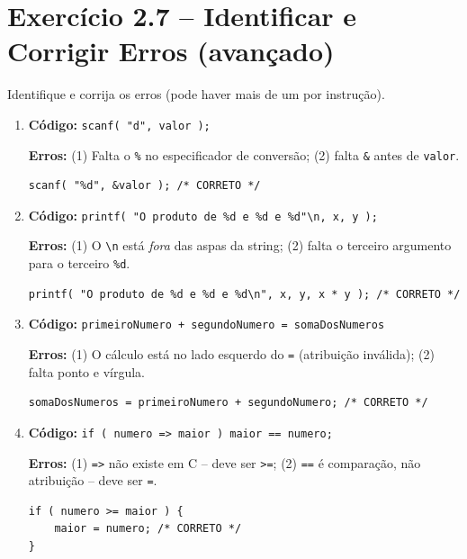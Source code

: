 \documentclass[12pt,a4paper]{article}
\begin{document}
\section{Exercício 2.7 -- Identificar e Corrigir Erros (avançado)}

\begin{enunciadoBox}[Enunciado 2.7]
Identifique e corrija os erros (pode haver mais de um por instrução).
\end{enunciadoBox}

\begin{respostabox}
\begin{enumerate}[label=\textbf{\alph*)}]

\item \textbf{Código:} \texttt{scanf( "d", valor );}

\textbf{Erros:} (1) Falta o \texttt{\%} no especificador de conversão; (2) falta \texttt{\&} antes de \texttt{valor}.
\begin{lstlisting}
scanf( "%d", &valor ); /* CORRETO */
\end{lstlisting}

\item \textbf{Código:} \texttt{printf( "O produto de \%d e \%d e \%d"\textbackslash n, x, y );}

\textbf{Erros:} (1) O \texttt{\textbackslash n} está \textit{fora} das aspas da string; (2) falta o terceiro argumento para o terceiro \texttt{\%d}.
\begin{lstlisting}
printf( "O produto de %d e %d e %d\n", x, y, x * y ); /* CORRETO */
\end{lstlisting}

\item \textbf{Código:} \texttt{primeiroNumero + segundoNumero = somaDosNumeros}

\textbf{Erros:} (1) O cálculo está no lado esquerdo do \texttt{=} (atribuição inválida); (2) falta ponto e vírgula.
\begin{lstlisting}
somaDosNumeros = primeiroNumero + segundoNumero; /* CORRETO */
\end{lstlisting}

\item \textbf{Código:} \texttt{if ( numero => maior ) maior == numero;}

\textbf{Erros:} (1) \texttt{=>} não existe em C -- deve ser \texttt{>=}; (2) \texttt{==} é comparação, não atribuição -- deve ser \texttt{=}.
\begin{lstlisting}
if ( numero >= maior ) {
    maior = numero; /* CORRETO */
}
\end{lstlisting}


\end{enumerate}
\end{respostabox}
\end{document}
